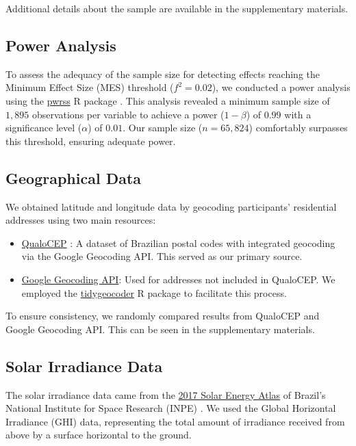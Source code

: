 \documentclass[
12pt,
openright,
oneside,
a4paper,
chapter=TITLE,
section=TITLE,
french,
spanish,
brazil,
english
]{abntex2}
\providecommand{\tightlist}{
\setlength{\itemsep}{0ex}\setlength{\parskip}{0\baselineskip}}
\begin{document}
Additional details about the sample are available in the supplementary
materials.

\subsection{Power Analysis}\label{power-analysis}

To assess the adequacy of the sample size for detecting effects reaching
the Minimum Effect Size (MES) threshold (\(f^2 = 0.02\)), we conducted a
power analysis using the
\href{https://cran.r-project.org/web/packages/pwrss/vignettes/examples.html}{pwrss}
R package \autocite{bulus}. This analysis revealed a minimum sample size
of \(1,895\) observations per variable to achieve a power
(\(1 - \beta\)) of \(0.99\) with a significance level (\(\alpha\)) of
\(0.01\). Our sample size (\(n = 65,824\)) comfortably surpasses this
threshold, ensuring adequate power.

\subsection{Geographical Data}\label{geographical-data}

We obtained latitude and longitude data by geocoding participants'
residential addresses using two main resources:

\begin{itemize}
\tightlist
\item
  \href{https://www.qualocep.com/}{QualoCEP} \autocite{qualocep2024}: A
  dataset of Brazilian postal codes with integrated geocoding via the
  Google Geocoding API. This served as our primary source.
\item
  \href{https://developers.google.com/maps/documentation/geocoding/overview}{Google
  Geocoding API}: Used for addresses not included in QualoCEP. We
  employed the
  \href{https://jessecambon.github.io/tidygeocoder/}{tidygeocoder} R
  package \autocite{cambon2021} to facilitate this process.
\end{itemize}

To ensure consistency, we randomly compared results from QualoCEP and
Google Geocoding API. This can be seen in the supplementary materials.

\subsection{Solar Irradiance Data}\label{solar-irradiance-data}

The solar irradiance data came from the
\href{https://labren.ccst.inpe.br/atlas_2017.html}{2017 Solar Energy
Atlas} of Brazil's National Institute for Space Research (INPE)
\autocite{pereira2017}. We used the Global Horizontal Irradiance (GHI)
data, representing the total amount of irradiance received from above by
a surface horizontal to the ground.
\end{document}
